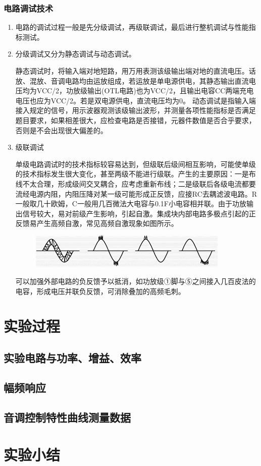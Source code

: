 \documentclass[a4paper,11pt,UTF8]{article}
\numberwithin{equation}{subsection}
\begin{document}
\subsubsection{电路调试技术}
\begin{enumerate}
	\setlength{\itemsep}{0pt}
	\item 电路的调试过程一般是先分级调试，再级联调试，最后进行整机调试与性能指标测试。
	\item 分级调试又分为静态调试与动态调试。
	
	静态调试时，将输入端对地短路，用万用表测该级输出端对地的直流电压。话放、混放、音调电路均由运放组成，若运放是单电源供电，其静态输出直流电压均为\newline VCC/2，功放级输出(OTL电路)也为VCC/2，且输出电容CC两端充电电压也应为\newline VCC/2。若是双电源供电，直流电压均为0。
	动态调试是指输入端接入规定的信号，用示波器观测该级输出波形，并测量各项性能指标是否满足题目要求，如果相差很大，应检查电路是否接错，元器件数值是否合乎要求，否则是不会出现很大偏差的。
	\item 级联调试
	
	单级电路调试时的技术指标较容易达到，但级联后级间相互影响，可能使单级的技术指标发生很大变化，甚至两级不能进行级联。产生的主要原因：一是布线不太合理，形成级间交叉耦合，应考虑重新布线；二是级联后各级电流都要流经电源内阻，内阻压降对某一级可能形成正反馈，应接RC去耦滤波电路。R一般取几十欧姆，C一般用几百微法大电容与0.1F小电容相并联。由于功放输出信号较大，易对前级产生影响，引起自激。集成块内部电路多极点引起的正反馈易产生高频自激，常见高频自激现象如图所示。
	\begin{figure}[H]
		\centering
		\includegraphics[width=0.9\textwidth]{2}
	\end{figure}
	可以加强外部电路的负反馈予以抵消，如功放级①脚与⑤之间接入几百皮法的电容，形成电压并联负反馈，可消除叠加的高频毛刺。
	
\end{enumerate}
\section{实验过程}
\subsection{实验电路与功率、增益、效率}
\subsection{幅频响应}
\subsection{音调控制特性曲线测量数据}

\section{实验小结}
\end{document}
